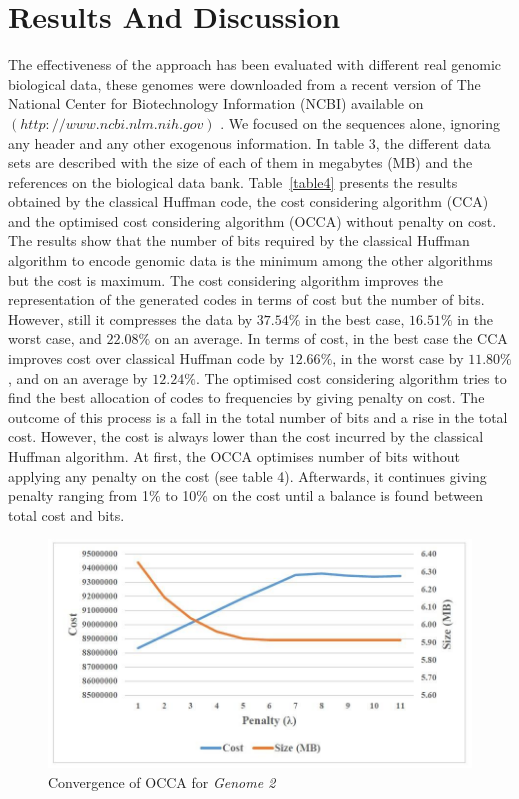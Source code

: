 \documentclass{singlecol-new}
\theoremstyle{TH}{
\newtheorem{lemma}{Lemma}
\newtheorem{theorem}[lemma]{Theorem}
\newtheorem{corrolary}[lemma]{Corrolary}
\newtheorem{conjecture}[lemma]{Conjecture}
\newtheorem{proposition}[lemma]{Proposition}
\newtheorem{claim}[lemma]{Claim}
\newtheorem{stheorem}[lemma]{Wrong Theorem}
}
\theoremstyle{THrm}{
\newtheorem{definition}{Definition}
\newtheorem{question}{Question}
\newtheorem{remark}{Remark}
\newtheorem{scheme}{Scheme}
}
\theoremstyle{THhit}{
\newtheorem{case}{Case}[section]
}
\begin{document}
\section{Results And Discussion}
\label{sec4}
The effectiveness of the approach has been evaluated with different real genomic biological data, these genomes were downloaded from a recent version of The National Center for Biotechnology Information (NCBI) available on $(http://www.ncbi.nlm.nih.gov)$ \citep{pruitt2009ncbi}. We focused on the sequences alone, ignoring any header and any other exogenous information. In table 3, the different data sets are described with the size  of each of them in megabytes (MB) and the references on the biological data bank.
Table~\ref{table4} presents the results obtained by the classical Huffman code, the cost considering algorithm (CCA) and the optimised cost considering algorithm (OCCA) without penalty on cost. The results show that the number of bits required by the classical Huffman algorithm to encode genomic data is the minimum among the other algorithms but the cost is  maximum. The cost considering algorithm improves the representation of the generated codes in terms of cost but the number of bits. However, still it compresses the data by $37.54\%$ in the best case, $16.51\%$ in the worst case, and $22.08\%$ on an average. In terms of cost, in the best case the CCA improves cost over classical Huffman code by $12.66\%$, in the worst case by $11.80\%$, and on an average by $12.24\%$.  The optimised cost considering algorithm tries to find the best allocation of codes to frequencies by giving penalty on cost. The outcome of this process is a fall in the total number of bits and a rise in the total cost. However, the cost is always lower than the cost incurred by the classical Huffman algorithm. At first, the OCCA optimises number of bits without applying any penalty on the cost (see table 4). Afterwards, it continues giving penalty ranging from 1\% to 10\% on the cost  until a balance is found between total cost and bits. 

\begin{figure}[h]
\caption{Convergence of OCCA for \textit{Genome 2}}
\begin{center}
\includegraphics[scale=0.4]{Images/drawing4_1.jpg}
\end{center}
\label{Fig5}
\end{figure}
\end{document}
